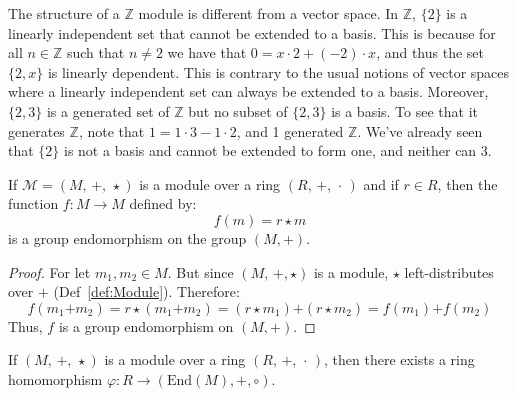     The structure of a $\mathbb{Z}$ module is different from a vector space.
    In $\mathbb{Z}$, $\{2\}$ is a linearly independent set that cannot be
    extended to a basis. This is because for all $n\in\mathbb{Z}$ such that
    $n\ne{2}$ we have that $0=x\cdot{2}+(\minus{2})\cdot{x}$, and thus the set
    $\{2,x\}$ is linearly dependent. This is contrary to the usual notions of
    vector spaces where a linearly independent set can always be extended to a
    basis. Moreover, $\{2,3\}$ is a generated set of $\mathbb{Z}$ but no subset
    of $\{2,3\}$ is a basis. To see that it generates $\mathbb{Z}$, note that
    $1=1\cdot{3}-1\cdot{2}$, and 1 generated $\mathbb{Z}$. We've already seen
    that $\{2\}$ is not a basis and cannot be extended to form one, and neither
    can 3.
    \begin{theorem}
        \label{thm:Scalar_Mult_in_Module_Defines_Group_Endo}%
        If $\mathcal{M}=(M,\,\boldsymbol{+},\,\star)$ is a module over a ring
        $(R,\,+,\,\cdot\,)$ and if $r\in{R}$, then the function
        $f:M\rightarrow{M}$ defined by:
        \begin{equation}
            f(m)=r\star{m}
        \end{equation}
        is a group endomorphism on the group $(M,\boldsymbol{+})$.
    \end{theorem}
    \begin{proof}
        For let $m_{1},m_{2}\in{M}$. But since $(M,\,\boldsymbol{+},\star)$
        is a module, $\star$ left-distributes over $\boldsymbol{+}$
        (Def~\ref{def:Module}). Therefore:
        \begin{equation}
            f(m_{1}\boldsymbol{+}m_{2})
            =r\star(m_{1}\boldsymbol{+}m_{2})
            =(r\star{m}_{1})\boldsymbol{+}(r\star{m}_{2})
            =f(m_{1})\boldsymbol{+}f(m_{2})
        \end{equation}
        Thus, $f$ is a group endomorphism on $(M,\boldsymbol{+})$.
    \end{proof}
    \begin{theorem}
        If $(M,\,\boldsymbol{+},\,\star)$ is a module over a ring
        $(R,\,+,\,\cdot\,)$, then there exists a ring homomorphism
        $\varphi:R\rightarrow(\textrm{End}(M),\boldsymbol{+},\circ)$.
    \end{theorem}
